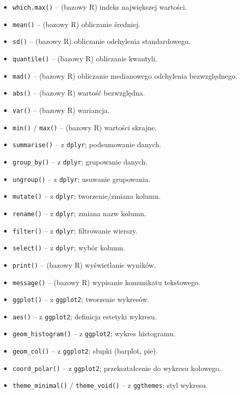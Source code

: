 \documentclass[polish]{article}
\begin{document}
\begin{itemize}
        \item \texttt{which.max()} -- (bazowy R) indeks największej wartości.
        \item \texttt{mean()} -- (bazowy R) obliczanie średniej.
        \item \texttt{sd()} -- (bazowy R) obliczanie odchylenia standardowego.
        \item \texttt{quantile()} -- (bazowy R) obliczanie kwantyli.
        \item \texttt{mad()} -- (bazowy R) obliczanie medianowego odchylenia bezwzględnego.
        \item \texttt{abs()} -- (bazowy R) wartość bezwzględna.
        \item \texttt{var()} -- (bazowy R) wariancja.
        \item \texttt{min()} / \texttt{max()} -- (bazowy R) wartości skrajne.
        \item \texttt{summarise()} -- z \texttt{dplyr}; podsumowanie danych.
        \item \texttt{group\_by()} -- z \texttt{dplyr}; grupowanie danych.
        \item \texttt{ungroup()} -- z \texttt{dplyr}; usuwanie grupowania.
        \item \texttt{mutate()} -- z \texttt{dplyr}; tworzenie/zmiana kolumn.
        \item \texttt{rename()} -- z \texttt{dplyr}; zmiana nazw kolumn.
        \item \texttt{filter()} -- z \texttt{dplyr}; filtrowanie wierszy.
        \item \texttt{select()} -- z \texttt{dplyr}; wybór kolumn.
        \item \texttt{print()} -- (bazowy R) wyświetlanie wyników.
        \item \texttt{message()} -- (bazowy R) wypisanie komunikatu tekstowego.
        \item \texttt{ggplot()} -- z \texttt{ggplot2}; tworzenie wykresów.
        \item \texttt{aes()} -- z \texttt{ggplot2}; definicja estetyki wykresu.
        \item \texttt{geom\_histogram()} -- z \texttt{ggplot2}; wykres histogramu.
        \item \texttt{geom\_col()} -- z \texttt{ggplot2}; słupki (barplot, pie).
        \item \texttt{coord\_polar()} -- z \texttt{ggplot2}; przekształcenie do wykresu kołowego.
        \item \texttt{theme\_minimal()} / \texttt{theme\_void()} -- z \texttt{ggthemes}; styl wykresu.

\end{itemize}
\end{document}
